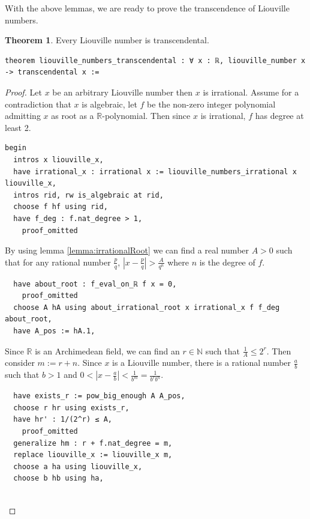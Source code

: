 \documentclass{report}
\theoremstyle{definition}
\newtheorem{theorem}{Theorem}[section]
\begin{document}
With the above lemmas, we are ready to prove the transcendence of Liouville numbers.
\begin{theorem}\label{thm:liouvilleTrans}
Every Liouville number is transcendental.
\begin{verbatim}
theorem liouville_numbers_transcendental : ∀ x : ℝ, liouville_number x -> transcendental x := 
\end{verbatim}
\end{theorem}

\begin{proof}
Let $x$ be an arbitrary Liouville number then $x$ is irrational. Assume for a contradiction that $x$ is algebraic, let $f$ be the non-zero integer polynomial admitting $x$ as root as a $\mathbb R$-polynomial. Then since $x$ is irrational, $f$ has degree at least 2.

\begin{verbatim}
begin
  intros x liouville_x,
  have irrational_x : irrational x := liouville_numbers_irrational x liouville_x,
  intros rid, rw is_algebraic at rid,
  choose f hf using rid, 
  have f_deg : f.nat_degree > 1,
    proof_omitted
\end{verbatim}

By using lemma \ref{lemma:irrationalRoot} we can find a real number $A>0$ such that for any rational number $\frac pq$, $\left|x-\frac pq\right|>\frac A{q^n}$ where $n$ is the degree of $f$.
\begin{verbatim} 
  have about_root : f_eval_on_ℝ f x = 0,
    proof_omitted
  choose A hA using about_irrational_root x irrational_x f f_deg about_root,
  have A_pos := hA.1,
\end{verbatim}

Since $\mathbb R$ is an Archimedean field, we can find an $r\in\mathbb N$ such that $\frac1A\le2^r$. Then consider $m:=r+n$. Since $x$ is a Liouville number, there is a rational number $\frac a b$ such that $b>1$ and $0<\left|x-\frac a b\right|<\frac1{b^m}=\frac1{b^r b^n}$.
\begin{verbatim} 
  have exists_r := pow_big_enough A A_pos, 
  choose r hr using exists_r,
  have hr' : 1/(2^r) ≤ A,
    proof_omitted
  generalize hm : r + f.nat_degree = m,
  replace liouville_x := liouville_x m,
  choose a ha using liouville_x,
  choose b hb using ha,


\end{verbatim}
\end{proof}
\end{document}
